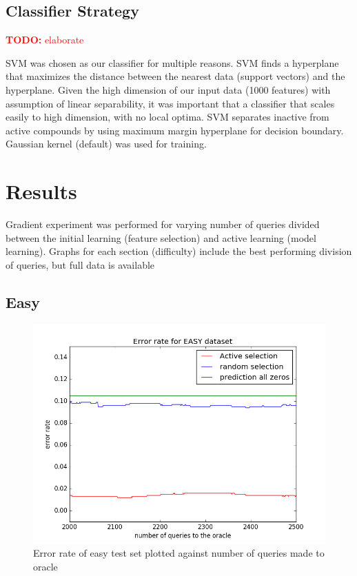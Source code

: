 \documentclass[paper=a4, fontsize=11pt]{scrartcl}
\numberwithin{equation}{section}    %
\numberwithin{figure}{section}      %
\numberwithin{table}{section}       %
\newcommand{\TODO}[1]{\textcolor{red}{\textbf{TODO: } #1}}
\numberwithin{equation}{section}    %
\numberwithin{figure}{section}      %
\numberwithin{table}{section}       %
\begin{document}
\subsection{Classifier Strategy}

\TODO{elaborate}


SVM was chosen as our classifier for multiple reasons. SVM finds a hyperplane that maximizes the distance between the nearest data (support vectors) and the hyperplane. Given the high dimension of our input data (1000 features) with assumption of linear separability, it was important that a classifier that scales easily to high dimension, with no local optima. SVM separates inactive from active compounds by using maximum margin hyperplane for decision boundary. 
Gaussian kernel (default) was used for training. 


\section{Results}

Gradient experiment was performed for varying number of queries divided between the initial learning (feature selection) and active learning (model learning). Graphs for each section (difficulty) include the best performing division of queries, but full data is available 

\subsection{Easy}


\begin{figure}[!htb]
  \centering
  \includegraphics[scale = 0.5]{figures/error_easy.png}
      \caption{Error rate of easy test set plotted against number of queries made to oracle}
      \label{easyerror}
\end{figure}
\end{document}
